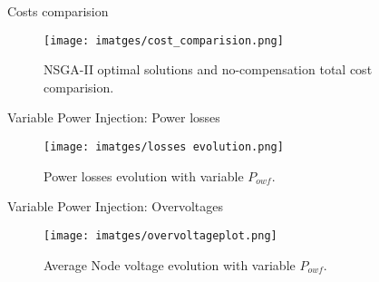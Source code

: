 \begin{frame}{Costs comparision}
    \begin{figure}
        \centering
        \texttt{[image: imatges/cost\_comparision.png]}
        \caption{NSGA-II optimal solutions and no-compensation total cost comparision.}
    \end{figure}

\end{frame}

% 
% 
% 
% 
% 
% 
%         

\begin{frame}{Variable Power Injection: Power losses}
    \begin{figure}
        \centering
        \texttt{[image: imatges/losses evolution.png]}
        \caption{Power losses evolution with variable $P_{owf}$.}
    \end{figure}

\end{frame}

\begin{frame}{Variable Power Injection: Overvoltages}
    \begin{figure}
        \centering
        \texttt{[image: imatges/overvoltageplot.png]}
        \caption{Average Node voltage evolution with variable $P_{owf}$.}
    \end{figure}

\end{frame}


